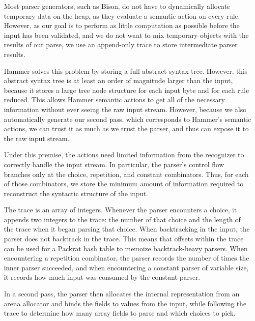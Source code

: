 Most parser generators, such as Bison, do not have to dynamically allocate temporary data on the
heap, as they evaluate a semantic action on every rule. However, as our goal is to perform as little
computation as possible before the input has been validated, and we do not want to mix temporary
objects with the results of our parse, we use an append-only trace to store intermediate parser
results.

Hammer solves this problem by storing a full abstract syntax tree. However, this
abstract syntax tree is at least an order of magnitude larger than the input,
because it stores a large tree node structure for each input byte and for each
rule reduced. This allows Hammer semantic actions to get all of the necessary
information without ever seeing the raw input stream. However, because we also
automatically generate our second pass, which corresponds to Hammer's semantic
actions, we can trust it as much as we trust the parser, and thus can expose it
to the raw input stream.

Under this premise, the actions need limited information from the
recognizer to correctly handle the input stream. In particular, the parser's
control flow branches only at the choice, repetition, and constant combinators.
Thus, for each of those combinators, we store the minimum amount of information
required to reconstruct the syntactic structure of the input.

The trace is an
array of integers.
Whenever the parser encounters a choice, it appends two integers to the trace:
the number of that choice and
the length of the trace when it began parsing that choice. When backtracking in
the input, the parser does not backtrack in the trace. This means that offsets
within the trace can be used for a Packrat hash table to memoize backtrack-heavy
parsers.
When encountering a repetition combinator, the parser records the number of
times the inner parser succeeded, and when encountering a constant parser of
variable size, it records how much input was consumed by the constant parser. 

In a second pass, the parser then allocates the internal representation from an
arena allocator and binds the fields to values from the input, while following
the trace to determine how many array fields to parse and which choices to pick.


